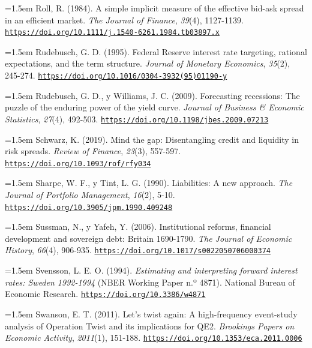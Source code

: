 \documentclass[10pt,a4paper]{article}
\begin{document}
\noindent\hangindent=1.5em Roll, R. (1984). A simple implicit measure of the effective bid-ask spread in an efficient market. \textit{The Journal of Finance}, \textit{39}(4), 1127-1139. \href{https://doi.org/10.1111/j.1540-6261.1984.tb03897.x}{\nolinkurl{https://doi.org/10.1111/j.1540-6261.1984.tb03897.x}}

\noindent\hangindent=1.5em Rudebusch, G. D. (1995). Federal Reserve interest rate targeting, rational expectations, and the term structure. \textit{Journal of Monetary Economics}, \textit{35}(2), 245-274. \href{https://doi.org/10.1016/0304-3932(95)01190-y}{\nolinkurl{https://doi.org/10.1016/0304-3932(95)01190-y}}

\noindent\hangindent=1.5em Rudebusch, G. D., y Williams, J. C. (2009). Forecasting recessions: The puzzle of the enduring power of the yield curve. \textit{Journal of Business \& Economic Statistics}, \textit{27}(4), 492-503. \href{https://doi.org/10.1198/jbes.2009.07213}{\nolinkurl{https://doi.org/10.1198/jbes.2009.07213}}

\noindent\hangindent=1.5em Schwarz, K. (2019). Mind the gap: Disentangling credit and liquidity in risk spreads. \textit{Review of Finance}, \textit{23}(3), 557-597. \href{https://doi.org/10.1093/rof/rfy034}{\nolinkurl{https://doi.org/10.1093/rof/rfy034}}

\noindent\hangindent=1.5em Sharpe, W. F., y Tint, L. G. (1990). Liabilities: A new approach. \textit{The Journal of Portfolio Management}, \textit{16}(2), 5-10. \href{https://doi.org/10.3905/jpm.1990.409248}{\nolinkurl{https://doi.org/10.3905/jpm.1990.409248}}

\noindent\hangindent=1.5em Sussman, N., y Yafeh, Y. (2006). Institutional reforms, financial development and sovereign debt: Britain 1690-1790. \textit{The Journal of Economic History}, \textit{66}(4), 906-935. \href{https://doi.org/10.1017/s0022050706000374}{\nolinkurl{https://doi.org/10.1017/s0022050706000374}}

\noindent\hangindent=1.5em Svensson, L. E. O. (1994). \textit{Estimating and interpreting forward interest rates: Sweden 1992-1994} (NBER Working Paper n.º 4871). National Bureau of Economic Research. \href{https://doi.org/10.3386/w4871}{\nolinkurl{https://doi.org/10.3386/w4871}}

\noindent\hangindent=1.5em Swanson, E. T. (2011). Let's twist again: A high-frequency event-study analysis of Operation Twist and its implications for QE2. \textit{Brookings Papers on Economic Activity}, \textit{2011}(1), 151-188. \href{https://doi.org/10.1353/eca.2011.0006}{\nolinkurl{https://doi.org/10.1353/eca.2011.0006}}
\end{document}

